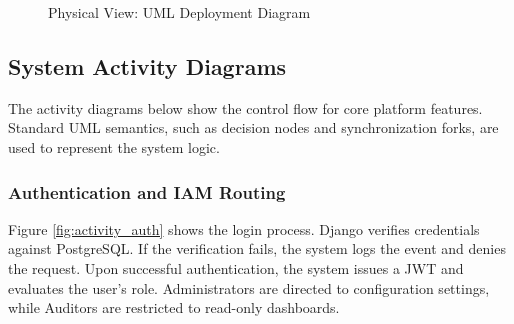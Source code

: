 \begin{figure}[H]
{
    }
    \caption{Physical View: UML Deployment Diagram}
    \label{fig:deployment_diagram}
\end{figure}

\subsection{System Activity Diagrams}
The activity diagrams below show the control flow for core platform features. Standard UML semantics, such as decision nodes and synchronization forks, are used to represent the system logic.

\subsubsection{Authentication and IAM Routing}
Figure \ref{fig:activity_auth} shows the login process. Django verifies credentials against PostgreSQL. If the verification fails, the system logs the event and denies the request. Upon successful authentication, the system issues a JWT and evaluates the user's role. Administrators are directed to configuration settings, while Auditors are restricted to read-only dashboards.

